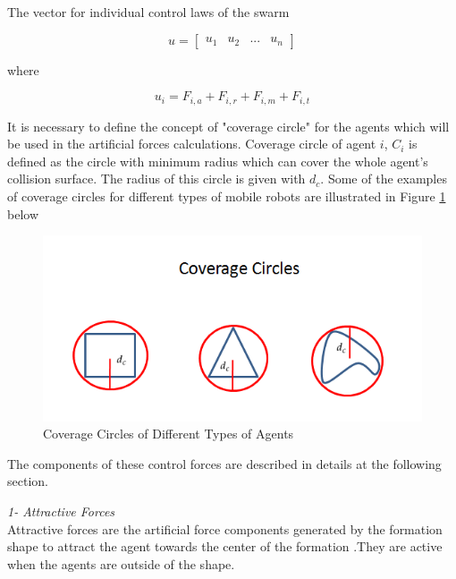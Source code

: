The vector for individual control laws of the swarm

\begin{equation}
u = \begin{bmatrix}
u_1 & u_2 & ... & u_n
\end{bmatrix}
\end{equation}

where

\begin{equation}
u_i = F_{i,a} + F_{i,r} + F_{i,m} + F_{i,t}
\end{equation}

It is necessary to define the concept of "coverage circle"	for the agents which will be used in the artificial forces calculations. Coverage circle of agent $i$, $C_i$ is defined as the circle with minimum radius which can cover the whole agent's collision surface. The radius of this circle is given with $d_c$. Some of the examples of coverage circles for different types of mobile robots are illustrated in Figure \ref{coverage_circle_ref} below
		
\begin{figure}[H]
\caption{Coverage Circles of Different Types of Agents} \label{coverage_circle_ref}
\centering
\includegraphics[scale = 0.60]{coverage_circles}
\end{figure}
		
The components of these  control forces are described in details at the following section. \newline

\textit{			1- Attractive Forces} \\ 
Attractive forces are the artificial force components generated by the formation shape to attract the agent towards the center of the formation .They are active when the agents are outside of the shape. 

